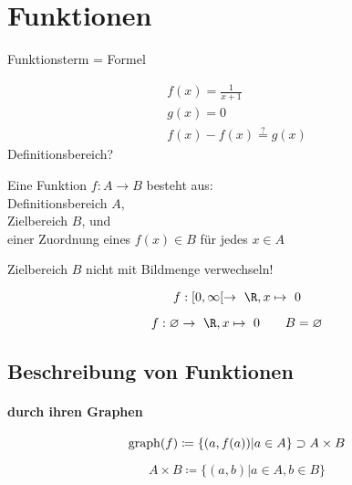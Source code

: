 \chapter{Funktionen}
Funktionsterm = Formel \\
\begin{bsp*}
	\begin{gather*}
		f(x) = \frac{1}{x+1} \\
		g(x) = 0 \\
		f(x) - f(x) \overset{?}{=} g(x)
	\end{gather*}
	Definitionsbereich?
\end{bsp*}\marginpar{$[a,b) = [a,b[$ halb-offenes Intervall\\\\ $\mapsto$ wird abgebildet auf\\\\ $\{\} = \emptyset$}
\begin{def*}[note = Funktion , index = Funktion]
	Eine Funktion $f: A \rightarrow B$ besteht aus: \\
	\qquad Definitionsbereich $A$, \\
	\qquad Zielbereich $B$, und \\
	\qquad einer Zuordnung eines $f(x) \in B$ für jedes $x \in A$
\end{def*}
\begin{bem}
	Zielbereich $B$ nicht mit Bildmenge verwechseln! \\
\end{bem}
\begin{bsp*}
	\[ f: [0,\infty [ \rightarrow \R , x \mapsto 0 \]
\end{bsp*}
\begin{bsp*}
	\[ f: \emptyset \rightarrow \R , x \mapsto 0 \qquad B = \varnothing \]
\end{bsp*}

\section{Beschreibung von Funktionen}
\subsubsection{durch ihren Graphen}
\begin{def*}[note = Graph , index = Graph]
	\[ \operatorname{graph}(f) \coloneqq \{ ( a , f(a) ) | a \in A \} \supset A \times B \]
\end{def*}
\begin{def*}[note = Kreuzmenge , index = Kreuzmenge]
	\[ A \times B \coloneqq \{ ( a , b ) | a \in A , b \in B \} \]
\end{def*}

